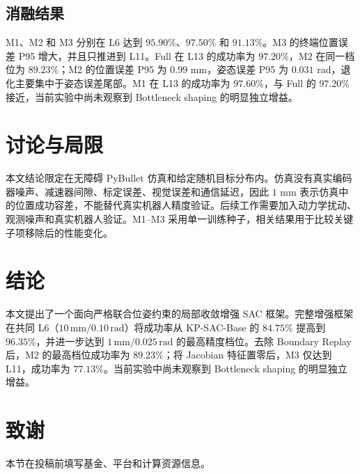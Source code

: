 \documentclass[conference]{IEEEtran}
\begin{document}
\subsection{消融结果}
M1、M2 和 M3 分别在 L6 达到 $95.90\%$、$97.50\%$ 和 $91.13\%$。M3 的终端位置误差 P95 增大，并且只推进到 L11。Full 在 L13 的成功率为 $97.20\%$，M2 在同一档位为 $89.23\%$；M2 的位置误差 P95 为 $0.99$ mm，姿态误差 P95 为 $0.031$ rad，退化主要集中于姿态误差尾部。M1 在 L13 的成功率为 $97.60\%$，与 Full 的 $97.20\%$ 接近，当前实验中尚未观察到 Bottleneck shaping 的明显独立增益。

\section{讨论与局限}
本文结论限定在无障碍 PyBullet 仿真和给定随机目标分布内。仿真没有真实编码器噪声、减速器间隙、标定误差、视觉误差和通信延迟，因此 $1$ mm 表示仿真中的位置成功容差，不能替代真实机器人精度验证。后续工作需要加入动力学扰动、观测噪声和真实机器人验证。M1--M3 采用单一训练种子，相关结果用于比较关键子项移除后的性能变化。

\section{结论}
本文提出了一个面向严格联合位姿约束的局部收敛增强 SAC 框架。完整增强框架在共同 L6（$10\,\mathrm{mm}/0.10\,\mathrm{rad}$）将成功率从 KP-SAC-Base 的 $84.75\%$ 提高到 $96.35\%$，并进一步达到 $1\,\mathrm{mm}/0.025\,\mathrm{rad}$ 的最高精度档位。去除 Boundary Replay 后，M2 的最高档位成功率为 $89.23\%$；将 Jacobian 特征置零后，M3 仅达到 L11，成功率为 $77.13\%$。当前实验中尚未观察到 Bottleneck shaping 的明显独立增益。

\section*{致谢}
本节在投稿前填写基金、平台和计算资源信息。
\end{document}
